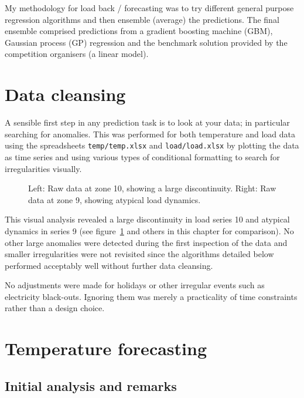 My methodology for load back / forecasting was to try different general purpose regression algorithms and then ensemble (average) the predictions.
The final ensemble comprised predictions from a gradient boosting machine (GBM), Gaussian process (GP) regression and the benchmark solution provided by the competition organisers (a linear model).

\section{Data cleansing}

\label{sec:cleans}

A sensible first step in any prediction task is to look at your data; in particular searching for anomalies.
This was performed for both temperature and load data using the spreadsheets \texttt{temp/temp.xlsx} and \texttt{load/load.xlsx} by plotting the data as time series and using various types of conditional formatting to search for irregularities visually.

\begin{figure}[ht]
  \begin{center}
    
  \end{center}
  \caption[Examples of unusual load dynamics.]{Left: Raw data at zone 10, showing a large discontinuity. Right: Raw data at zone 9, showing atypical load dynamics.}
  \label{fig:load}
\end{figure}

This visual analysis revealed a large discontinuity in load series 10 and atypical dynamics in series 9 (see figure~\ref{fig:load} and others in this chapter for comparison).
No other large anomalies were detected during the first inspection of the data and smaller irregularities were not revisited since the algorithms detailed below performed acceptably well without further data cleansing.

No adjustments were made for holidays or other irregular events such as electricity black-outs.
Ignoring them was merely a practicality of time constraints rather than a design choice.

\section{Temperature forecasting}

\label{sec:temp}

\subsection{Initial analysis and remarks}

